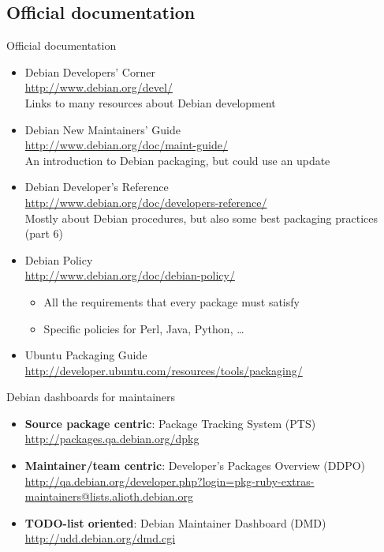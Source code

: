 \documentclass[10pt,final]{beamer}
\begin{document}
\subsection{Official documentation}
\begin{frame}{Official documentation}
  \begin{itemize}
  \item Debian Developers' Corner\\
    \url{http://www.debian.org/devel/}\\
    {\small Links to many resources about Debian development}
    \hbr
  \item Debian New Maintainers' Guide\\
    \url{http://www.debian.org/doc/maint-guide/}\\
    {\small An introduction to Debian packaging, but could use an update}
    \hbr
  \item Debian Developer's Reference\\
    \url{http://www.debian.org/doc/developers-reference/}\\
    {\small Mostly about Debian procedures, but also some best packaging practices (part 6)}
    \hbr
  \item Debian Policy\\
    \url{http://www.debian.org/doc/debian-policy/}\\
    
    {\small \begin{itemize}
      \item \small All the requirements that every package must satisfy
      \item \small Specific policies for Perl, Java, Python, \ldots
      \end{itemize}}
    \hbr
    
  \item Ubuntu Packaging Guide\\
    \url{http://developer.ubuntu.com/resources/tools/packaging/}
  \end{itemize}
\end{frame}

\begin{frame}{Debian dashboards for maintainers}
  \begin{itemize}
	  \item \textbf{Source package centric}: Package Tracking System (PTS)\\
    \url{http://packages.qa.debian.org/dpkg}
    \br
  \item \textbf{Maintainer/team centric}: Developer's Packages Overview (DDPO)\\
    \url{http://qa.debian.org/developer.php?login=pkg-ruby-extras-maintainers@lists.alioth.debian.org}
    \br
  \item \textbf{TODO-list oriented}: Debian Maintainer Dashboard (DMD)\\
    \url{http://udd.debian.org/dmd.cgi}
  \end{itemize}
\end{frame}
\end{document}
